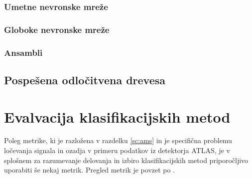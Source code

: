 \documentclass[11pt,a4paper,openany]{book}
\begin{document}
\subsubsection{Umetne nevronske mreže}

\subsubsection{Globoke nevronske mreže}

\subsubsection{Ansambli}

\subsection{Pospešena odločitvena drevesa}


\section{Evalvacija klasifikacijskih metod}

Poleg metrike, ki je razložena v razdelku \ref{sc:ams} in je specifična problemu ločevanja signala in ozadja v primeru podatkov iz detektorja ATLAS, je v splošnem za razumevanje delovanja in izbiro klasifikacijskih metod priporočljivo uporabiti še nekaj metrik. Pregled metrik je povzet po \cite{wiki:precision_and_recall}.
\end{document}
